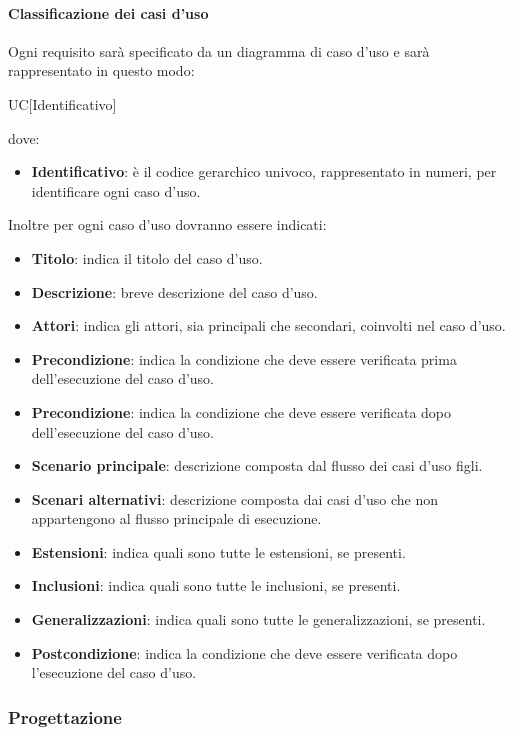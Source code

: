 \paragraph{Classificazione dei casi d'uso}
Ogni requisito sarà specificato da un diagramma di caso d'uso e sarà rappresentato in questo modo:
\begin{center}
  UC[Identificativo]
\end{center}
dove:
\begin{itemize}
  \item\textbf{Identificativo}: è il codice gerarchico univoco, rappresentato in numeri, per identificare ogni caso d'uso.
\end{itemize}
Inoltre per ogni caso d'uso dovranno essere indicati:
\begin{itemize}
  \item\textbf{Titolo}: indica il titolo del caso d'uso.
  \item\textbf{Descrizione}: breve descrizione del caso d'uso.
  \item\textbf{Attori}: indica gli attori, sia principali che secondari, coinvolti nel caso d'uso.
  \item\textbf{Precondizione}: indica la condizione che deve essere verificata prima
  dell'esecuzione del caso d'uso.
   \item\textbf{Precondizione}: indica la condizione che deve essere verificata dopo dell'esecuzione del caso d'uso.
  \item\textbf{Scenario principale}: descrizione composta dal flusso dei casi d'uso
  figli.
  \item\textbf{Scenari alternativi}: descrizione composta dai casi d'uso che non
  appartengono al flusso principale di esecuzione.
  \item\textbf{Estensioni}: indica quali sono tutte le estensioni, se presenti.
  \item\textbf{Inclusioni}: indica quali sono tutte le inclusioni, se presenti.
  \item\textbf{Generalizzazioni}: indica quali sono tutte le generalizzazioni,
  se presenti.
  \item\textbf{Postcondizione}: indica la condizione che deve essere verificata dopo
  l'esecuzione del caso d'uso.
\end{itemize}

\subsubsection{Progettazione}

